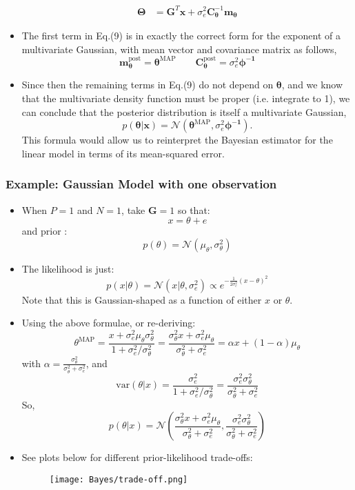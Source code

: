 \documentclass[12pt]{article}
\newcommand{\sigd}{\sigma^2}
\newcommand{\var}{\textrm{var}}
\newcommand{\gau}{\mathcal{N}}
\newcommand{\thetab}{\boldsymbol{\theta}}
\newcommand{\Thetab}{\boldsymbol{\Theta}}
\newcommand{\xb}{\mathbf{x}}
\newcommand{\Gb}{\mathbf{G}}
\newcommand{\map}{\textrm{MAP}}
\newcommand{\thetamap}{\thetab^\map}
\newcommand{\mb}{\mathbf{m}}
\newcommand{\cb}{\mathbf{C}}
\newcommand{\mbt}{\mb_{\thetab}}
\newcommand{\cbt}{\cb_{\thetab}}
\begin{document}
\begin{itemize}
\begin{align*}
         \Thetab &= \Gb^T \xb + \sigd_e \cbt^{-1}\mbt
     \end{align*}
     \item The first term in Eq.(9) is in exactly the correct form for the exponent of a multivariate Gaussian, with mean vector and covariance matrix as follows,
     \[
     \mbt^{\textrm{post}} = \thetamap \qquad \cbt^{\textrm{post}} = \sigd_e \boldsymbol{\phi^{-1}}
     \]
     \item Since then the remaining terms in Eq.(9) do not depend on $\thetab$, and we know that the multivariate density function must be proper (i.e. integrate to 1), we can conclude that the posterior distribution is itself a multivariate Gaussian,
     \[
     p(\thetab | \xb) = \gau (\thetamap , \sigd_e \boldsymbol{\phi^{-1}}).
     \]
     This formula would allow us to reinterpret the Bayesian estimator for the linear model in terms of its mean-squared error.
\end{itemize}
\subsubsection{Example: Gaussian Model with one observation}
\begin{itemize}
    \item When $P =1$ and $ N =1$, take $\Gb = 1$ so that:
    \[
    x = \theta + e
    \]
    and prior : 
    \[
    p(\theta) = \gau(\mu_\theta , \sigd_\theta)
    \]
    \item The likelihood is just:
    \[
    p(x|\theta) = \gau(x | \theta,\sigd_e) \propto e^{-\frac{1}{2\sigd_e}(x-\theta)^2}
    \]
    Note that this is Gaussian-shaped as a function of either $x$ or $\theta$. 
    \item Using the above formulae, or re-deriving:
    \[
    \theta^\map = \frac{x + \sigd_e \mu_\theta \sigd_\theta}{1 + \sigd_e/\sigd_\theta} = \frac{\sigd_\theta x + \sigd_e \mu_\theta}{\sigd_\theta + \sigd_e} = \alpha x + (1-\alpha)\mu_\theta
    \]
    with $\alpha = \frac{\sigd_\theta}{\sigd_\theta + \sigd_e}$, and 
    \[
    \var(\theta|x) = \frac{\sigd_e}{1 + \sigd_e/\sigd_\theta} = \frac{\sigd_e \sigd_\theta}{\sigd_\theta + \sigd_e}
    \]
    So,
    \[
    p(\theta | x) = \gau \left( \frac{\sigd_\theta x + \sigd_e \mu_\theta}{\sigd_\theta + \sigd_e}, \frac{\sigd_e \sigd_\theta}{\sigd_\theta + \sigd_e} \right)
    \]
    \item See plots below for different prior-likelihood trade-offs:
    \begin{figure}[H]
        \centering
        \texttt{[image: Bayes/trade-off.png]}
    \end{figure}
\end{itemize}
\end{document}
